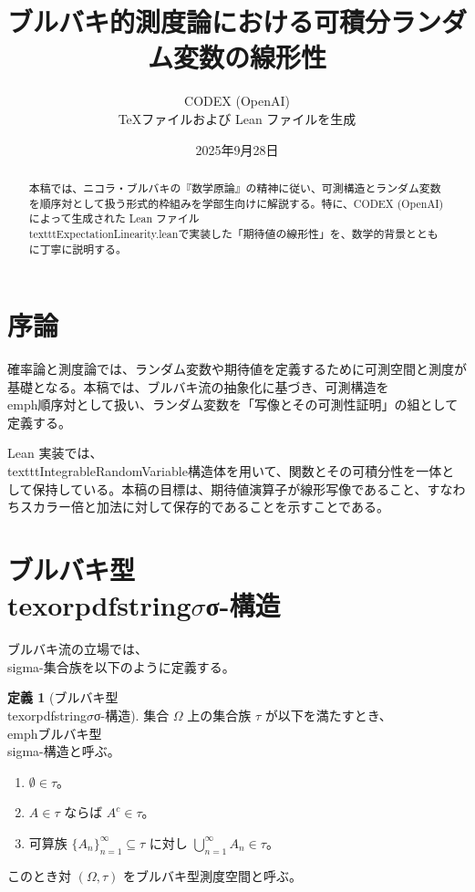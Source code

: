 \documentclass[12pt]{ltjsarticle}
\title{ブルバキ的測度論における可積分ランダム変数の線形性}
\author{CODEX (OpenAI)\\\small TeXファイルおよび Lean ファイルを生成}
\date{2025年9月28日}
\theoremstyle{definition}
\newtheorem{definition}{定義}[section]
\theoremstyle{plain}
\begin{document}
\maketitle

\begin{abstract}
本稿では、ニコラ・ブルバキの『数学原論』の精神に従い、可測構造とランダム変数を順序対として扱う形式的枠組みを学部生向けに解説する。特に、CODEX (OpenAI) によって生成された Lean ファイル\\texttt{ExpectationLinearity.lean}で実装した「期待値の線形性」を、数学的背景とともに丁寧に説明する。
\end{abstract}

\tableofcontents

\section{序論}
確率論と測度論では、ランダム変数や期待値を定義するために可測空間と測度が基礎となる。本稿では、ブルバキ流の抽象化に基づき、可測構造を\\emph{順序対}として扱い、ランダム変数を「写像とその可測性証明」の組として定義する。

Lean 実装では、\\texttt{IntegrableRandomVariable}構造体を用いて、関数とその可積分性を一体として保持している。本稿の目標は、期待値演算子が線形写像であること、すなわちスカラー倍と加法に対して保存的であることを示すことである。

\section{ブルバキ型\\texorpdfstring{$\sigma$}{σ}-構造}
ブルバキ流の立場では、\\sigma-集合族を以下のように定義する。

\begin{definition}[ブルバキ型\\texorpdfstring{$\sigma$}{σ}-構造]
集合 $\Omega$ 上の集合族 $\tau$ が以下を満たすとき、\\emph{ブルバキ型\\sigma-構造}と呼ぶ。
\begin{enumerate}[label=\textup{(\roman*)}]
  \item $\emptyset \in \tau$。
  \item $A \in \tau$ ならば $A^c \in \tau$。
  \item 可算族 $\{A_n\}_{n=1}^\infty \subseteq \tau$ に対し $\bigcup_{n=1}^\infty A_n \in \tau$。
\end{enumerate}
このとき対 $(\Omega,\tau)$ をブルバキ型測度空間と呼ぶ。
\end{definition}
\end{document}
